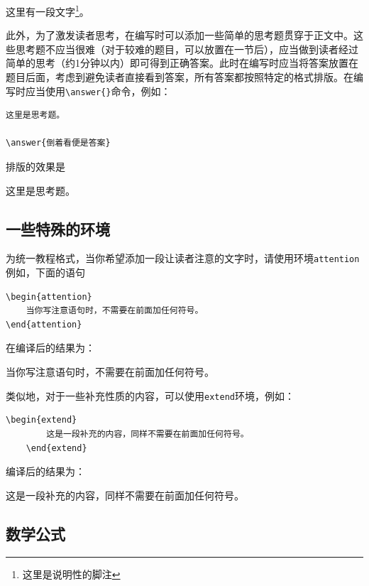 这里有一段文字\footnote{这里是说明性的脚注}。

此外，为了激发读者思考，在编写时可以添加一些简单的思考题贯穿于正文中。这些思考题不应当很难（对于较难的题目，可以放置在一节后），应当做到读者经过简单的思考（约1分钟以内）即可得到正确答案。此时在编写时应当将答案放置在题目后面，考虑到避免读者直接看到答案，所有答案都按照特定的格式排版。在编写时应当使用\verb|\answer{}|命令，例如：

\begin{lstlisting}[frame=line]
这里是思考题。

\answer{倒着看便是答案}
\end{lstlisting}

排版的效果是

这里是思考题。


\subsection{一些特殊的环境}\label{subsec:关于如何使用LaTeX编写模板-一些特殊的环境}

为统一教程格式，当你希望添加一段让读者注意的文字时，请使用环境\verb|attention|例如，下面的语句

\begin{lstlisting}[frame=line]
\begin{attention}
    当你写注意语句时，不需要在前面加任何符号。
\end{attention}
\end{lstlisting}
在编译后的结果为：

\begin{attention}
    当你写注意语句时，不需要在前面加任何符号。
\end{attention}

类似地，对于一些补充性质的内容，可以使用\verb|extend|环境，例如：
\begin{lstlisting}[frame=line]
    \begin{extend}
        这是一段补充的内容，同样不需要在前面加任何符号。
    \end{extend}
\end{lstlisting}

编译后的结果为：

\begin{extend}
    这是一段补充的内容，同样不需要在前面加任何符号。
\end{extend}

\subsection{数学公式}\label{subsec:关于如何使用LaTeX编写模板-数学公式}


